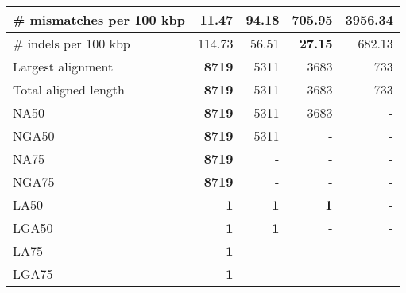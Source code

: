 \documentclass[12pt,a4paper]{article}
\begin{document}
\begin{table}[ht]
\begin{center}
\begin{tabular}{|l*{4}{|r}|}
\# mismatches per 100 kbp & {\bf 11.47} & 94.18 & 705.95 & 3956.34 \\ \hline
\# indels per 100 kbp & 114.73 & 56.51 & {\bf 27.15} & 682.13 \\ \hline
Largest alignment & {\bf 8719} & 5311 & 3683 & 733 \\ \hline
Total aligned length & {\bf 8719} & 5311 & 3683 & 733 \\ \hline
NA50 & {\bf 8719} & 5311 & 3683 & - \\ \hline
NGA50 & {\bf 8719} & 5311 & - & - \\ \hline
NA75 & {\bf 8719} & - & - & - \\ \hline
NGA75 & {\bf 8719} & - & - & - \\ \hline
LA50 & {\bf 1} & {\bf 1} & {\bf 1} & - \\ \hline
LGA50 & {\bf 1} & {\bf 1} & - & - \\ \hline
LA75 & {\bf 1} & - & - & - \\ \hline
LGA75 & {\bf 1} & - & - & - \\ \hline
\end{tabular}
\end{center}
\end{table}
\end{document}

